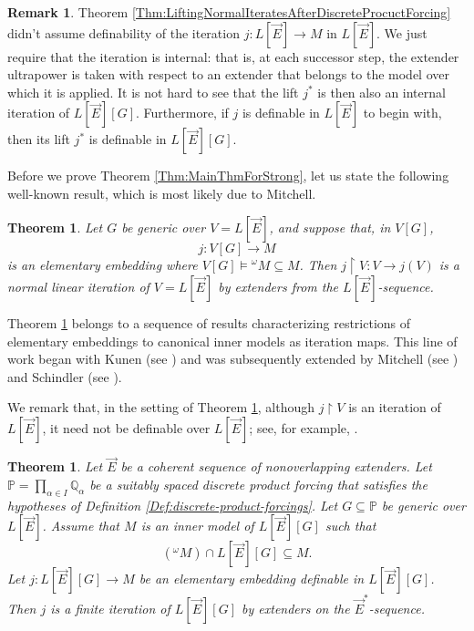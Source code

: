 \documentclass{article}
\theoremstyle{definition}
\newtheorem{remark}[definition]{Remark}
\theoremstyle{plain}
\newtheorem{theorem}[definition]{Theorem}
\newcommand{\po}{\mathbb{P}}
\newcommand{\qo}{\mathbb{Q}}
\newcommand{\uhr}{\upharpoonright}
\begin{document}
\begin{remark}
Theorem \ref{Thm:LiftingNormalIteratesAfterDiscreteProcuctForcing} didn't assume definability of the iteration $j\colon L[\vec{E}]\to M$ in $L[\vec{E}]$. We just require that the iteration is internal: that is, at each successor step, the extender ultrapower is taken with respect to an extender that belongs to the model over which it is applied. It is not hard to see that the lift $j^*$ is then also an internal iteration of $L[\vec{E}][G]$. Furthermore, if $j$ is definable in $L[\vec{E}]$ to begin with, then its lift $j^*$ is definable in $L[\vec E][G]$.
    
\end{remark}


Before we prove Theorem \ref{Thm:MainThmForStrong}, let us state the following well-known result, which is most likely due to Mitchell.


\begin{theorem} \label{Thm:RestrictionsAreIterations}
Let $G$ be generic over $V=L[\vec E]$, and suppose that, in $V[G]$,
\[
j\colon V[G]\to M
\]
is an elementary embedding where $V[G]\vDash {}^\omega M \subseteq M$. Then $j\restriction V\colon V\to j(V)$
is a normal linear iteration of $V=L[\vec E]$ by extenders
from the $L[\vec E]$-sequence.
\end{theorem}

Theorem \ref{Thm:RestrictionsAreIterations} belongs to a sequence of results characterizing restrictions of elementary embeddings to canonical inner models as iteration maps. This line of work began with Kunen (see \cite{KunenMeasures}) and was subsequently extended by Mitchell (see \cite{Mitchellcore}) and Schindler (see \cite{Schi}).


We remark that, in the setting of Theorem \ref{Thm:RestrictionsAreIterations}, although $j\uhr V$ is an iteration of $L[\vec E]$, it need not be definable over $L[\vec E]$; see, for example, \cite[Section 5.2]{GitikKaplan}.


\begin{theorem}\label{Thm:EveryEmbeddingIsAFiniteIteration}
    Let $\vec{E}$ be a coherent sequence of nonoverlapping extenders. Let $\po = \prod_{\alpha\in I} \qo_\alpha$ be a suitably spaced discrete product forcing that satisfies the hypotheses of Definition \ref{Def:discrete-product-forcings}. Let $G\subseteq \po$ be generic over $L[\vec{E}]$. Assume that $M$ is an inner model of $L[\vec E][G]$ such that 
    $$({}^\omega M)\cap L[\vec E][G]\subseteq M.$$
    Let $j\colon L[\vec E][G]\to M $ be an elementary embedding definable in $L[\vec{E}][G]$. Then $j$ is a finite iteration of $L[\vec{E}][G]$ by extenders on the $\vec{E}^*$-sequence.
\end{theorem}
\end{document}
